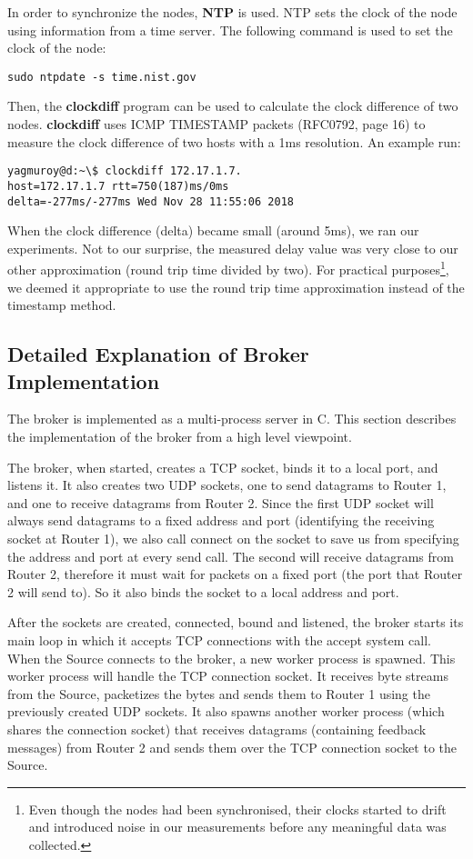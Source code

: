 \documentclass[conference]{IEEEtran}
\begin{document}
In order to synchronize the nodes, \textbf{NTP} is used. NTP sets the clock of the
node using information from a time server. The following command is used to set the
clock of the node:
\begin{lstlisting}
sudo ntpdate -s time.nist.gov
\end{lstlisting}
Then, the \textbf{clockdiff} program can be used to calculate the clock difference
of two nodes. \textbf{clockdiff} uses ICMP TIMESTAMP packets (RFC0792, page 16)
to measure the clock difference of two hosts with a 1ms resolution. An example run:
\begin{lstlisting}
yagmuroy@d:~\$ clockdiff 172.17.1.7.
host=172.17.1.7 rtt=750(187)ms/0ms
delta=-277ms/-277ms Wed Nov 28 11:55:06 2018
\end{lstlisting}
When the clock difference (delta) became small (around 5ms), we ran our experiments.
Not to our surprise, the measured delay value was very close to our other approximation
(round trip time divided by two). For practical purposes\footnote{Even though the nodes had been
synchronised, their clocks started to drift and introduced noise in our measurements
before any meaningful data was collected.}, we deemed it appropriate
to use the round trip time approximation instead of the timestamp method.

\subsection{Detailed Explanation of Broker Implementation }
The broker is implemented as a multi-process server in C. This section describes
the implementation of the broker from a high level viewpoint.

The broker, when started, creates a TCP socket, binds it to a local port, and listens
it. It also creates two UDP sockets, one to send datagrams to Router 1, and one to receive
datagrams from Router 2. Since the first UDP socket will always send datagrams to a
fixed address and port (identifying the receiving socket at Router 1), we also
call connect on the socket to save us from specifying the address and port at every send call.
The second will receive datagrams from Router 2, therefore it must wait for packets
on a fixed port (the port that Router 2 will send to). So it also binds the socket
to a local address and port.

After the sockets are created, connected, bound and listened, the broker starts
its main loop in which it accepts TCP connections with the accept system call.
When the Source connects to the broker, a new worker process is spawned. This worker
process will handle the TCP connection socket. It receives byte streams from the Source,
packetizes the bytes and sends them to Router 1 using the previously
created UDP sockets. It also spawns another worker process (which shares the connection
socket) that receives datagrams (containing feedback messages) from Router 2 and
sends them over the TCP connection socket to the Source.
\end{document}
